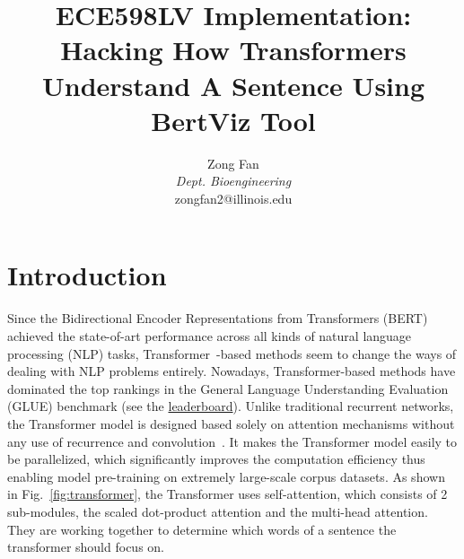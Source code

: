 \documentclass[]{article}
\title{ECE598LV Implementation: Hacking How Transformers Understand A Sentence Using BertViz Tool}
\author{Zong Fan \\
\textit{Dept. Bioengineering} \\
zongfan2@illinois.edu
}
\begin{document}
\maketitle

\section{Introduction}
Since the Bidirectional Encoder Representations from Transformers (BERT)~\cite{devlin2018bert} achieved the state-of-art performance across all kinds of natural language processing (NLP) tasks, Transformer~\cite{vaswani2017attention}-based methods seem to change the ways of dealing with NLP problems entirely. 
Nowadays, Transformer-based methods have dominated the top rankings in the General Language Understanding Evaluation (GLUE) benchmark (see the \hyperlink{https://gluebenchmark.com/leaderboard}{leaderboard}).
Unlike traditional recurrent networks, the Transformer model is designed based solely on attention mechanisms without any use of recurrence and convolution~\cite{vaswani2017attention}.
It makes the Transformer model easily to be parallelized, which significantly improves the computation efficiency thus enabling model pre-training on extremely large-scale corpus datasets. 
As shown in Fig.~\ref{fig:transformer}, the Transformer uses self-attention, which consists of 2 sub-modules, the scaled dot-product attention and the multi-head attention. 
They are working together to determine which words of a sentence the transformer should focus on. 
\end{document}
